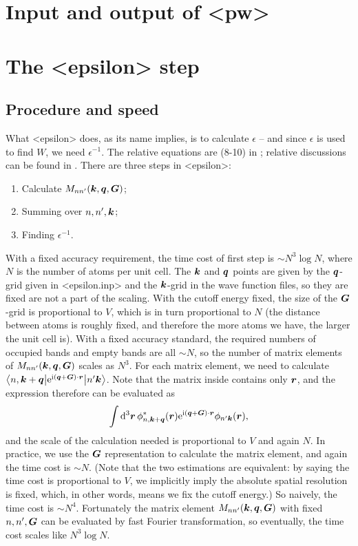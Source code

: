 \documentclass[hyperref, a4paper, 12pt]{report}
\newcommand*{\ii}{\mathrm{i}}
\newcommand*{\ee}{\mathrm{e}}
\def\texttt#1{<#1>}%
\newcommand{\shortcode}[1]{\texttt{#1}}
\begin{document}
\section{Input and output of \shortcode{pw}}

\section{The \shortcode{epsilon} step}

\subsection{Procedure and speed}\label{sec:epsilon.procedure-speed}

What \shortcode{epsilon} does, 
as its name implies, is to calculate $\epsilon$ --
and since $\epsilon$ is used to find $W$,
we need $\epsilon^{-1}$.
The relative equations are (8-10) in \cite{berkeleygw};
relative discussions can be found in .
There are three steps in \shortcode{epsilon}:
\begin{enumerate}
    \item Calculate $M_{nn'}(\vb*{k}, \vb*{q}, \vb*{G})$;
    \item Summing over $n, n', \vb*{k}$;
    \item Finding $\epsilon^{-1}$.
\end{enumerate}

With a fixed accuracy requirement,
the time cost of first step is $\sim N^3 \log N$,
where $N$ is the number of atoms per unit cell.
The $\vb*{k}$ and $\vb*{q}$ points are given 
by the $\vb*{q}$-grid given in \shortcode{epsilon.inp}
and the $\vb*{k}$-grid in the wave function files,
so they are fixed are not a part of the scaling.
With the cutoff energy fixed,
the size of the $\vb*{G}$-grid is proportional to $V$,
which is in turn proportional to $N$
(the distance between atoms is roughly fixed,
and therefore the more atoms we have,
the larger the unit cell is).
With a fixed accuracy standard,
the required numbers of occupied bands and empty bands 
are all $\sim N$,
so the number of matrix elements of $M_{nn'}(\vb*{k}, \vb*{q}, \vb*{G})$ scales as $N^3$.
For each matrix element, 
we need to calculate 
$\mel**{n, \vb*{k} + \vb*{q}}{\ee^{\ii (\vb*{q} + \vb*{G}) \cdot \vb*{r} }}{n' \vb*{k}}$.
Note that the matrix inside contains only $\vb*{r}$,
and the expression therefore can be evaluated as 
\[
    \int \dd[3]{\vb*{r}} \phi_{n, \vb*{k} + \vb*{q}}^*(\vb*{r}) 
    \ee^{\ii (\vb*{q} + \vb*{G}) \cdot \vb*{r}}
    \phi_{n' \vb*{k}}(\vb*{r}),
\]
and the scale of the calculation needed is proportional to $V$
and again $N$.
In practice, we use the $\vb*{G}$ representation to calculate the matrix element,
and again the time cost is $\sim N$.
(Note that the two estimations are equivalent: 
by saying the time cost is proportional to $V$,
we implicitly imply the absolute spatial resolution is fixed,
which, in other words, means we fix the cutoff energy.)
So naively, the time cost is $\sim N^4$.
Fortunately the matrix element $M_{nn'}(\vb*{k}, \vb*{q}, \vb*{G})$
with fixed $n, n', \vb*{G}$ 
can be evaluated by fast Fourier transformation,
so eventually, the time cost scales like $N^3 \log N$.
\end{document}
